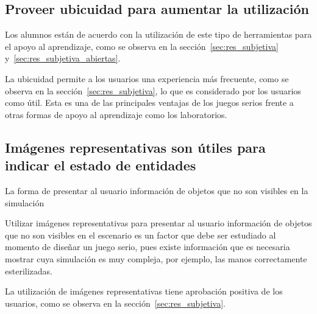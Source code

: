 \subsection{Proveer ubicuidad para aumentar la utilización}


Los alumnos están de acuerdo con la utilización de este tipo de herramientas
para el apoyo al aprendizaje, como se observa en la
sección~\ref{sec:res_subjetiva} y~\ref{sec:res_subjetiva_abiertas}.

La ubicuidad permite a los usuarios una experiencia más frecuente, como se
observa en la sección~\ref{sec:res_subjetiva}, lo que es considerado por los
usuarios como útil. Esta es una de las principales ventajas de los juegos serios
frente a otras formas de apoyo al aprendizaje como los laboratorios.

\subsection{Imágenes representativas son útiles para indicar el estado de
    entidades}

La forma de presentar al usuario información de objetos que no son visibles
en la simulación 

Utilizar imágenes representativas para presentar al usuario información de
objetos que no son visibles en el escenario es un factor que debe ser estudiado
al momento de diseñar un juego serio, pues existe información que es necesaria
mostrar cuya simulación es muy compleja, por ejemplo, las manos correctamente
esterilizadas.

La utilización de imágenes representativas tiene aprobación positiva de los
usuarios, como se observa en la sección~\ref{sec:res_subjetiva}.
